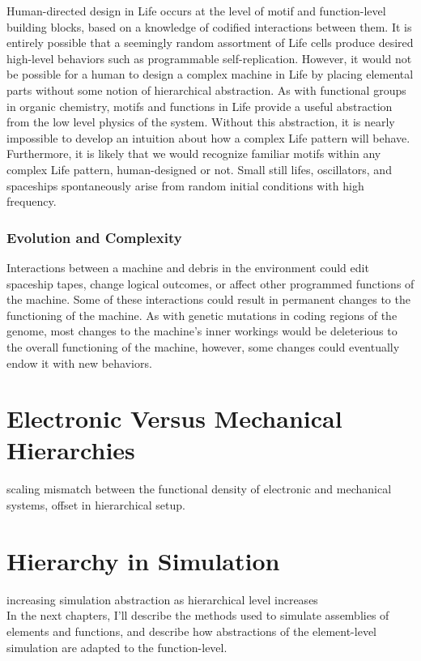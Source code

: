 {Human-directed design in Life occurs at the level of motif and function-level building blocks, based on a knowledge of codified interactions between them.  It is entirely possible that a seemingly random assortment of Life cells produce desired high-level behaviors such as programmable self-replication.  However, it would not be possible for a human to design a complex machine in Life by placing elemental parts without some notion of hierarchical abstraction.  As with functional groups in organic chemistry, motifs and functions in Life provide a useful abstraction from the low level physics of the system.  Without this abstraction, it is nearly impossible to develop an intuition about how a complex Life pattern will behave.  Furthermore, it is likely that we would recognize familiar motifs within any complex Life pattern, human-designed or not.  Small still lifes, oscillators, and spaceships spontaneously arise from random initial conditions with high frequency\cite{Flammenkamp2004}.

\subsubsection{Evolution and Complexity}

Interactions between a machine and debris in the environment could edit spaceship tapes, change logical outcomes, or affect other programmed functions of the machine.  Some of these interactions could result in permanent changes to the functioning of the machine.  As with genetic mutations in coding regions of the genome, most changes to the machine's inner workings would be deleterious to the overall functioning of the machine, however, some changes could eventually endow it with new behaviors.

\section{Electronic Versus Mechanical Hierarchies}

scaling mismatch between the functional density of electronic and mechanical systems, offset in hierarchical setup.

\section{Hierarchy in Simulation}

increasing simulation abstraction as hierarchical level increases\\

In the next chapters, I'll describe the methods used to simulate assemblies of elements and functions, and describe how abstractions of the element-level simulation are adapted to the function-level.



}
